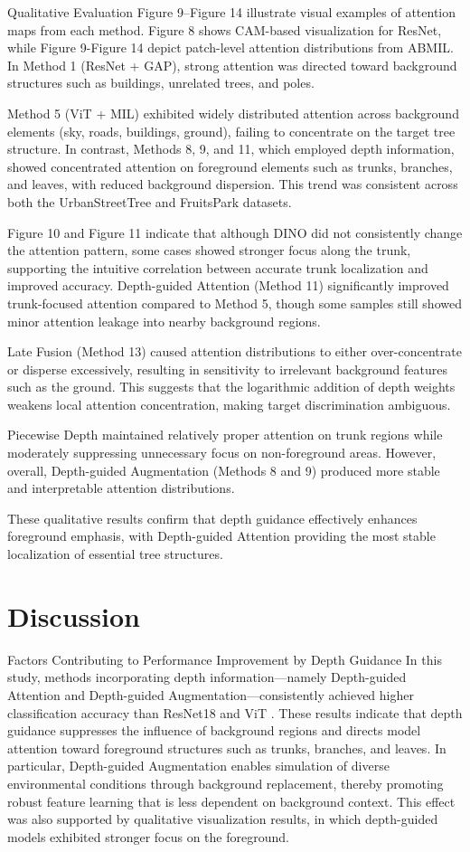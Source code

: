\documentclass{article}
\begin{document}
Qualitative Evaluation
Figure 9–Figure 14 illustrate visual examples of attention maps from each method. Figure 8 shows CAM-based visualization for ResNet, while Figure 9-Figure 14 depict patch-level attention distributions from ABMIL. In Method 1 (ResNet + GAP), strong attention was directed toward background structures such as buildings, unrelated trees, and poles. 

Method 5 (ViT + MIL) exhibited widely distributed attention across background elements (sky, roads, buildings, ground), failing to concentrate on the target tree structure.
In contrast, Methods 8, 9, and 11, which employed depth information, showed concentrated attention on foreground elements such as trunks, branches, and leaves, with reduced background dispersion. This trend was consistent across both the UrbanStreetTree and FruitsPark datasets.

Figure 10 and Figure 11 indicate that although DINO did not consistently change the attention pattern, some cases showed stronger focus along the trunk, supporting the intuitive correlation between accurate trunk localization and improved accuracy. Depth-guided Attention (Method 11) significantly improved trunk-focused attention compared to Method 5, though some samples still showed minor attention leakage into nearby background regions. 

Late Fusion (Method 13) caused attention distributions to either over-concentrate or disperse excessively, resulting in sensitivity to irrelevant background features such as the ground. This suggests that the logarithmic addition of depth weights weakens local attention concentration, making target discrimination ambiguous.

Piecewise Depth maintained relatively proper attention on trunk regions while moderately suppressing unnecessary focus on non-foreground areas. However, overall, Depth-guided Augmentation (Methods 8 and 9) produced more stable and interpretable attention distributions.

These qualitative results confirm that depth guidance effectively enhances foreground emphasis, with Depth-guided Attention providing the most stable localization of essential tree structures.

\section{Discussion}
Factors Contributing to Performance Improvement by Depth Guidance
In this study, methods incorporating depth information—namely Depth-guided Attention and Depth-guided Augmentation—consistently achieved higher classification accuracy than ResNet18 \cite{ref12} and ViT \cite{ref1}. These results indicate that depth guidance suppresses the influence of background regions and directs model attention toward foreground structures such as trunks, branches, and leaves. In particular, Depth-guided Augmentation enables simulation of diverse environmental conditions through background replacement, thereby promoting robust feature learning that is less dependent on background context. This effect was also supported by qualitative visualization results, in which depth-guided models exhibited stronger focus on the foreground.
\end{document}
